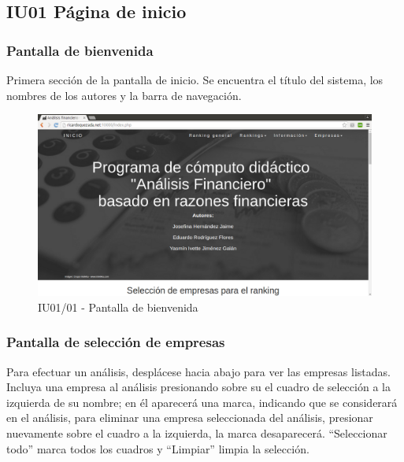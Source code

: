 \hypertarget{IU01}{\subsection{IU01 Página de inicio}}


    \subsubsection{Pantalla de bienvenida}

    Primera sección de la pantalla de inicio.
    Se encuentra el título del sistema, los nombres de los autores y la barra de navegación.

    \begin{figure}[H]
		\begin{center}
			\includegraphics[scale=0.3]{pantallas/Index1}
			\caption{IU01/01 - Pantalla de bienvenida}
		\end{center}
	\end{figure}


    \subsubsection{Pantalla de selección de empresas}

    Para efectuar un análisis, desplácese hacia abajo para ver las empresas listadas.
    Incluya una empresa al análisis presionando sobre su el cuadro de selección a la izquierda de su nombre;
    en él aparecerá una marca, indicando que se considerará en el análisis,
    para eliminar una empresa seleccionada del análisis,
    presionar nuevamente sobre el cuadro a la izquierda,
    la marca desaparecerá.
    ``Seleccionar todo'' marca todos los cuadros y ``Limpiar'' limpia la selección.

